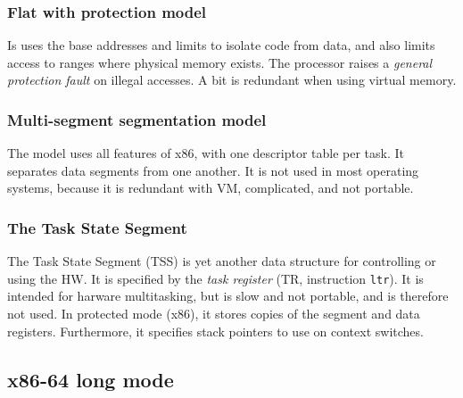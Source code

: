 \documentclass[toc]{../cs-classes/cs-classes}
\begin{document}
\subsubsection{Flat with protection model}
Is uses the base addresses and limits to isolate code from data, and also limits access to ranges where physical memory exists. The processor raises a \emph{general protection fault} on illegal accesses. A bit is redundant when using virtual memory.

\subsubsection{Multi-segment segmentation model}
The model uses all features of x86, with one descriptor table per task. It separates data segments from one another. It is not used in most operating systems, because it is redundant with VM, complicated, and not portable.

\subsubsection{The Task State Segment}
The Task State Segment (TSS) is yet another data structure for controlling or using the HW. It is specified by the \emph{task register} (TR, instruction \texttt{ltr}). It is intended for harware multitasking, but is slow and not portable, and is therefore not used. In protected mode (x86), it stores copies of the segment and data registers. Furthermore, it specifies stack pointers to use on context switches.

\subsection{x86-64 long mode}
\end{document}
